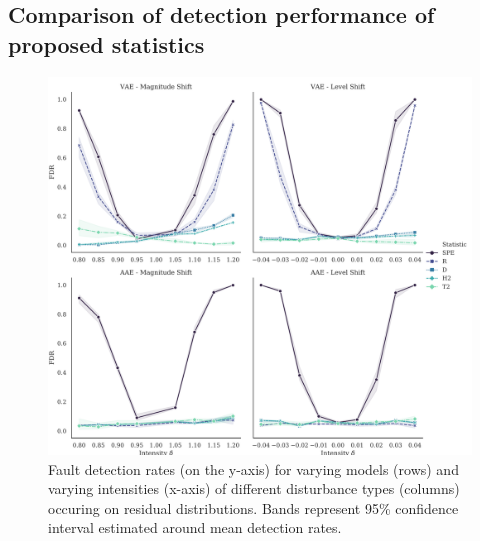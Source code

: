 \documentclass{scrartcl}
\theoremstyle{definition}
\begin{document}
\subsection{Comparison of detection performance of proposed statistics}
\begin{figure}[!t]
    
    \includegraphics[width=\linewidth]{figs/disturbance_on_pxz.pdf}
    \caption{Fault detection rates (on the y-axis) for varying models (rows) and varying intensities (x-axis) of different disturbance types (columns) occuring on residual distributions. Bands represent 95\% confidence interval estimated around mean detection rates. 
    }
    \label{fig:disturbance_on_pxz}
\end{figure}
\end{document}
